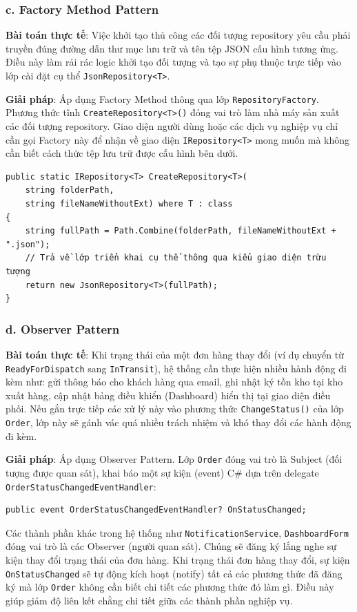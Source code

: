 \documentclass[12pt,a4paper]{article}
\begin{document}
\subsubsection*{c. Factory Method Pattern}

\textbf{Bài toán thực tế}: Việc khởi tạo thủ công các đối tượng repository yêu cầu phải truyền đúng đường dẫn thư mục lưu trữ và tên tệp JSON cấu hình tương ứng. Điều này làm rải rác logic khởi tạo đối tượng và tạo sự phụ thuộc trực tiếp vào lớp cài đặt cụ thể \texttt{JsonRepository<T>}.

\textbf{Giải pháp}: Áp dụng Factory Method thông qua lớp \texttt{RepositoryFactory}. Phương thức tĩnh \texttt{CreateRepository<T>()} đóng vai trò làm nhà máy sản xuất các đối tượng repository. Giao diện người dùng hoặc các dịch vụ nghiệp vụ chỉ cần gọi Factory này để nhận về giao diện \texttt{IRepository<T>} mong muốn mà không cần biết cách thức tệp lưu trữ được cấu hình bên dưới.

\begin{listing}[H]
\caption{RepositoryFactory hiện thực Factory Method}
\begin{verbatim}
public static IRepository<T> CreateRepository<T>(
    string folderPath,
    string fileNameWithoutExt) where T : class
{
    string fullPath = Path.Combine(folderPath, fileNameWithoutExt + ".json");
    // Trả về lớp triển khai cụ thể thông qua kiểu giao diện trừu tượng
    return new JsonRepository<T>(fullPath);
}
\end{verbatim}
\end{listing}

\subsubsection*{d. Observer Pattern}

\textbf{Bài toán thực tế}: Khi trạng thái của một đơn hàng thay đổi (ví dụ chuyển từ \texttt{ReadyForDispatch} sang \texttt{InTransit}), hệ thống cần thực hiện nhiều hành động đi kèm như: gửi thông báo cho khách hàng qua email, ghi nhật ký tồn kho tại kho xuất hàng, cập nhật bảng điều khiển (Dashboard) hiển thị tại giao diện điều phối. Nếu gắn trực tiếp các xử lý này vào phương thức \texttt{ChangeStatus()} của lớp \texttt{Order}, lớp này sẽ gánh vác quá nhiều trách nhiệm và khó thay đổi các hành động đi kèm.

\textbf{Giải pháp}: Áp dụng Observer Pattern. Lớp \texttt{Order} đóng vai trò là Subject (đối tượng được quan sát), khai báo một sự kiện (event) C\# dựa trên delegate \texttt{OrderStatusChangedEventHandler}:
\begin{verbatim}
public event OrderStatusChangedEventHandler? OnStatusChanged;
\end{verbatim}
Các thành phần khác trong hệ thống như \texttt{NotificationService}, \texttt{DashboardForm} đóng vai trò là các Observer (người quan sát). Chúng sẽ đăng ký lắng nghe sự kiện thay đổi trạng thái của đơn hàng. Khi trạng thái đơn hàng thay đổi, sự kiện \texttt{OnStatusChanged} sẽ tự động kích hoạt (notify) tất cả các phương thức đã đăng ký mà lớp \texttt{Order} không cần biết chi tiết các phương thức đó làm gì. Điều này giúp giảm độ liên kết chằng chi tiết giữa các thành phần nghiệp vụ.
\end{document}
